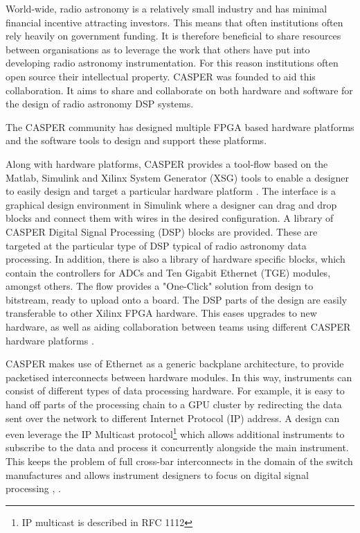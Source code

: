 \documentclass{ws-jai}
\begin{document}
World-wide, radio astronomy is a relatively small industry and has minimal financial incentive attracting investors. This means that often institutions often rely heavily on government funding. It is therefore beneficial to share resources between organisations as to leverage the work that others have put into developing radio astronomy instrumentation. For this reason institutions often open source their intellectual property. CASPER was founded to aid this collaboration. It aims to share and collaborate on both hardware and software for the design of radio astronomy DSP systems.

The CASPER community has designed multiple FPGA based hardware platforms and the software tools to design and support these platforms.

Along with hardware platforms, CASPER provides a tool-flow based on the Matlab, Simulink and Xilinx System Generator (XSG) tools to enable a designer to easily design and target a particular hardware platform \cite{pars05}. The interface is a graphical design environment in Simulink where a designer can drag and drop blocks and connect them with wires in the desired configuration. A library of CASPER Digital Signal Processing (DSP) blocks are provided. These are targeted at the particular type of DSP typical of radio astronomy data processing. In addition, there is also a library of hardware specific blocks, which contain the controllers for ADCs and Ten Gigabit Ethernet (TGE) modules, amongst others. The flow provides a "One-Click" solution from design to bitstream, ready to upload onto a board. The DSP parts of the design are easily transferable to other Xilinx FPGA hardware. This eases upgrades to new hardware, as well as aiding collaboration between teams using different CASPER hardware platforms \cite{pars05}.

CASPER makes use of Ethernet as a generic backplane architecture, to provide packetised interconnects between hardware modules. In this way, instruments can consist of different types of data processing hardware. For example, it is easy to hand off parts of the processing chain to a GPU cluster by redirecting the data sent over the network to different Internet Protocol (IP) address. A design can even leverage the IP Multicast protocol\footnote{IP multicast is described in RFC 1112} which allows additional instruments to subscribe to the data and process it concurrently alongside the main instrument. This keeps the problem of full cross-bar interconnects in the domain of the switch manufactures and allows instrument designers to focus on digital signal processing \cite{man14}, \cite{pars05}.
\end{document}
